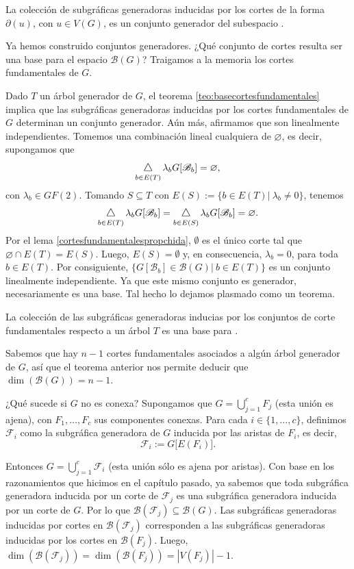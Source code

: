 \begin{prop} \label{prop:incidenceset}
La colección de subgráficas generadoras inducidas por los cortes de la forma $\partial(u)$, con $u \in V(G)$, es un conjunto generador del subespacio \bondt.
\end{prop}

Ya hemos construido conjuntos generadores. ¿Qué conjunto de cortes resulta ser una base para el espacio $\mathcal{B}(G)$? Traigamos a la memoria los cortes fundamentales de $G$. 

Dado $T$ un árbol generador de $G$, el teorema \ref{teo:basecortesfundamentales} implica que las subgráficas generadoras inducidas por los cortes fundamentales de $G$ determinan un conjunto generador. Aún más, afirmamos que son linealmente independientes. Tomemos una combinación lineal cualquiera de $\varnothing$, es decir, supongamos que  
$$
\difsym_{b \in E(T)} \lambda_{b}G[\mathscr{B}_{b}] = \varnothing,
$$
con $\lambda_{b} \in GF(2)$. Tomando $S\subseteq T$ con $E(S):=\{b \in E(T) | \:\! \lambda_{b} \neq 0\}$, tenemos
$$
\difsym_{b \in E(T)} \lambda_{b}G[\mathscr{B}_{b}] = \difsym_{b \in E(S)} \lambda_{b}G[\mathscr{B}_{b}]= \varnothing.
$$
Por el lema \ref{cortesfundamentalespropchida},  $\emptyset$ es el único corte tal que $\varnothing \cap E(T) = E(S)$. Luego, $E(S) = \emptyset$ y, en consecuencia, $\lambda_{b}=0$, para toda $b\in E(T)$. Por consiguiente, $\Big \{G[\mathscr{B}_{b}] \in \mathcal{B}(G) \Big|\: b\in E(T)\Big\}$ es un conjunto linealmente independiente. Ya que este mismo conjunto es generador,  necesariamente es una base. Tal hecho lo dejamos plasmado como un teorema.


\begin{teo}
La colección de las subgráficas generadoras inducias por los conjuntos de corte fundamentales respecto a un árbol $T$ es una base para \bondt.
\end{teo}

Sabemos que hay $n-1$ cortes fundamentales asociados a algún árbol generador de $G$, así que el teorema anterior nos permite deducir que $\dim(\mathcal{B}(G))=n-1$.

¿Qué sucede si $G$ no es conexa? Supongamos que $G = \bigcup_{j=1}^{c}F_{j}$ (esta unión es ajena), con $F_{1}, \ldots, F_{c}$ sus componentes conexas. Para cada $i \in \{1,\ldots, c\}$, definimos $\mathcal{F}_{i}$ como la subgráfica generadora de $G$ inducida por las aristas de $F_{i}$, es decir, $$\mathcal{F}_{i}:=G\Big[E(F_{i})\Big].$$

Entonces $G = \bigcup_{j=1}^{c}\mathcal{F}_{i}$ (esta unión sólo es ajena por aristas). Con base en los razonamientos que hicimos en el capítulo pasado, ya sabemos que toda subgráfica generadora inducida por un  corte de $\mathcal{F}_{j}$ es una subgráfica generadora inducida por un corte de $G$. Por lo que $\mathcal{B}(\mathcal{F}_{j}) \subseteq \mathcal{B}(G)$. Las subgráficas generadoras inducidas por cortes en $\mathcal{B}(\mathcal{F}_{j})$ corresponden a las subgráficas generadoras inducidas por los cortes en $\mathcal{B}(F_{j})$. Luego, $\dim(\mathcal{B}(\mathcal{F}_{j})) = \dim(\mathcal{B}(F_{j})) = |V(F_{j})| - 1$.

